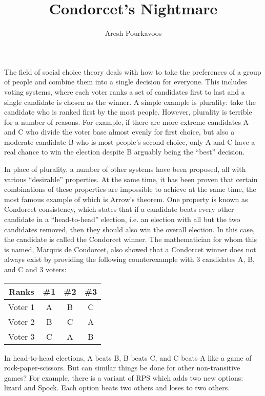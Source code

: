 \documentclass{article}
\begin{document}
\title{Condorcet's Nightmare}
\author{Aresh Pourkavoos}
\maketitle

The field of social choice theory deals with
how to take the preferences of a group of people
and combine them into a single decision for everyone.
This includes voting systems,
where each voter ranks a set of candidates first to last
and a single candidate is chosen as the winner.
A simple example is plurality:
take the candidate who is ranked first by the most people.
However, plurality is terrible for a number of reasons.
For example, if there are more extreme candidates A and C
who divide the voter base almost evenly for first choice,
but also a moderate candidate B who is most people's second choice,
only A and C have a real chance to win the election
despite B arguably being the ``best'' decision.

In place of plurality, a number of other systems have been proposed,
all with various ``desirable'' properties.
At the same time, it has been proven
that certain combinations of these properties are impossible to achieve at the same time,
the most famous example of which is Arrow's theorem.
One property is known as Condorcet consistency,
which states that if a candidate beats every other candidate in a ``head-to-head'' election,
i.e. an election with all but the two candidates removed,
then they should also win the overall election.
In this case, the candidate is called the Condorcet winner.
The mathematician for whom this is named, Marquis de Condorcet,
also showed that a Condorcet winner does not always exist
by providing the following counterexample
with 3 candidates A, B, and C and 3 voters:

\begin{center}
\begin{tabular}{|c|c c c|}
  \hline
  Ranks & \#1 & \#2 & \#3 \\ \hline
  Voter 1 & A & B & C \\ \hline
  Voter 2 & B & C & A \\ \hline
  Voter 3 & C & A & B \\ \hline
\end{tabular}
\end{center}

In head-to-head elections,
A beats B, B beats C, and C beats A
like a game of rock-paper-scissors.
But can similar things be done for other non-transitive games?
For example, there is a variant of RPS
which adds two new options: lizard and Spock.
Each option beats two others and loses to two others.
\end{document}
